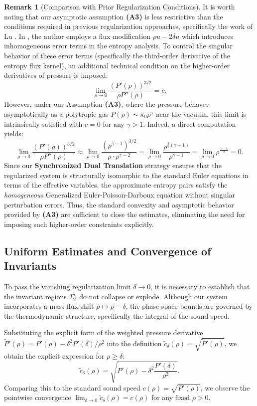 \documentclass[12pt, reqno]{article}
\theoremstyle{definition}
\newtheorem{remark}[theorem]{Remark}
\numberwithin{equation}{section}
\begin{document}
\begin{remark}[Comparison with Prior Regularization Conditions]
\label{rem:comparison_lu}
It is worth noting that our asymptotic assumption \textbf{(A3)} is less restrictive than the conditions required in previous regularization approaches, specifically the work of Lu \cite{Lu2007}. In \cite{Lu2007}, the author employs a flux modification $\rho u - 2\delta u$ which introduces inhomogeneous error terms in the entropy analysis. To control the singular behavior of these error terms (specifically the third-order derivative of the entropy flux kernel), an additional technical condition on the higher-order derivatives of pressure is imposed:
\[
\lim_{\rho\to 0} \frac{(P'(\rho))^{3/2}}{\rho P''(\rho)} = c.
\]
However, under our Assumption \textbf{(A3)}, where the pressure behaves asymptotically as a polytropic gas $P(\rho) \sim \kappa_0 \rho^\gamma$ near the vacuum, this limit is intrinsically satisfied with $c=0$ for any $\gamma > 1$. Indeed, a direct computation yields:
\[
\lim_{\rho\to 0} \frac{(P'(\rho))^{3/2}}{\rho P''(\rho)} \approx \lim_{\rho\to 0} \frac{(\rho^{\gamma-1})^{3/2}}{\rho \cdot \rho^{\gamma-2}} = \lim_{\rho\to 0} \frac{\rho^{\frac{3}{2}(\gamma-1)}}{\rho^{\gamma-1}} = \lim_{\rho\to 0} \rho^{\frac{\gamma-1}{2}} = 0.
\]
Since our \textbf{Synchronized Dual Translation} strategy ensures that the regularized system is structurally isomorphic to the standard Euler equations in terms of the effective variables, the approximate entropy pairs satisfy the \textit{homogeneous} Generalized Euler-Poisson-Darboux equation without singular perturbation errors. Thus, the standard convexity and asymptotic behavior provided by \textbf{(A3)} are sufficient to close the estimates, eliminating the need for imposing such higher-order constraints explicitly.
\end{remark}

\subsection{Uniform Estimates and Convergence of Invariants}

To pass the vanishing regularization limit $\delta \to 0$, it is necessary to establish that the invariant regions $\Sigma_\delta$ do not collapse or explode. Although our system incorporates a mass flux shift $\rho \mapsto \rho-\delta$, the phase-space bounds are governed by the thermodynamic structure, specifically the integral of the sound speed.

Substituting the explicit form of the weighted pressure derivative $\tilde{P}'(\rho) = P'(\rho) - \delta^2 P'(\delta)/\rho^2$ into the definition $\tilde{c}_\delta(\rho) = \sqrt{\tilde{P}'(\rho)}$, we obtain the explicit expression for $\rho \ge \delta$:
\begin{equation} \label{eq:c_delta_explicit}
    \tilde{c}_\delta(\rho) = \sqrt{P'(\rho) - \delta^2 \frac{P'(\delta)}{\rho^2}}.
\end{equation}
Comparing this to the standard sound speed $c(\rho) = \sqrt{P'(\rho)}$, we observe the pointwise convergence $\lim_{\delta \to 0} \tilde{c}_\delta(\rho) = c(\rho)$ for any fixed $\rho > 0$.
\end{document}
